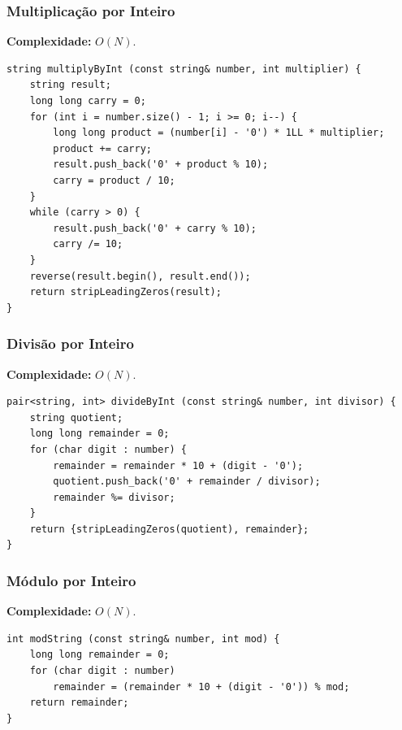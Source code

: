 \subsubsection{Multiplicação por Inteiro}

\textbf{Complexidade:} $O(N)$.

\begin{lstlisting}
string multiplyByInt (const string& number, int multiplier) {
    string result;
    long long carry = 0;
    for (int i = number.size() - 1; i >= 0; i--) {
        long long product = (number[i] - '0') * 1LL * multiplier;
        product += carry;
        result.push_back('0' + product % 10);
        carry = product / 10;
    }
    while (carry > 0) {
        result.push_back('0' + carry % 10);
        carry /= 10;
    }
    reverse(result.begin(), result.end());
    return stripLeadingZeros(result);
}
\end{lstlisting}



\subsubsection{Divisão por Inteiro}

\textbf{Complexidade:} $O(N)$.

\begin{lstlisting}
pair<string, int> divideByInt (const string& number, int divisor) {
    string quotient;
    long long remainder = 0;
    for (char digit : number) {
        remainder = remainder * 10 + (digit - '0');
        quotient.push_back('0' + remainder / divisor);
        remainder %= divisor;
    }
    return {stripLeadingZeros(quotient), remainder};
}
\end{lstlisting}



\subsubsection{Módulo por Inteiro}

\textbf{Complexidade:} $O(N)$.

\begin{lstlisting}
int modString (const string& number, int mod) {
    long long remainder = 0;
    for (char digit : number) 
        remainder = (remainder * 10 + (digit - '0')) % mod;
    return remainder;
}
\end{lstlisting}